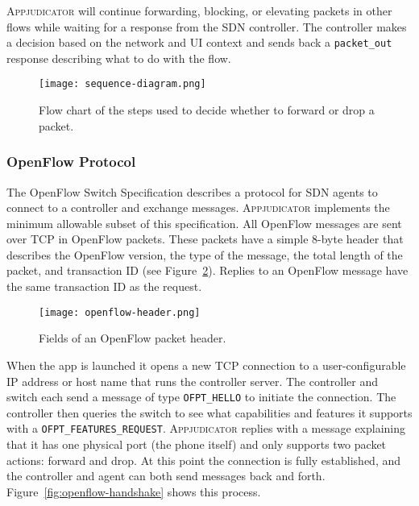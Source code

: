 \textsc{Appjudicator} will continue
forwarding, blocking, or elevating packets in other flows while waiting for a
response from the SDN controller. The controller makes a decision based on the
network and UI context and sends back a \texttt{packet\_out} response describing
what to do with the flow.

\begin{figure}[p]
    \centering
    \texttt{[image: sequence-diagram.png]}
    \caption{Flow chart of the steps used to decide whether to forward or drop a
		packet.}
    \label{fig:sequence-diagram}
\end{figure}

\subsubsection{OpenFlow Protocol}
\label{sec:openflow-protocol}

The OpenFlow Switch Specification describes a protocol for SDN agents to connect
to a controller and exchange messages. \textsc{Appjudicator} implements the
minimum allowable subset of this specification. All OpenFlow messages are sent
over TCP in OpenFlow packets. These packets have a simple 8-byte header that
describes the OpenFlow version, the type of the message, the total length of the
packet, and transaction ID (see Figure~\ref{fig:openflow-header}). Replies to an
OpenFlow message have the same transaction ID as the request.

\begin{figure}[h]
    \centering
    \texttt{[image: openflow-header.png]}
    \caption{Fields of an OpenFlow packet header.}
    \label{fig:openflow-header}
\end{figure}

When the app is launched it opens a new TCP connection to a user-configurable IP
address or host name that runs the controller server. The controller and switch
each send a message of type \texttt{OFPT\_HELLO} to initiate the connection. The
controller then queries the switch to see what capabilities and features it
supports with a \texttt{OFPT\_FEATURES\_REQUEST}.  \textsc{Appjudicator} replies
with a message explaining that it has one physical port (the phone itself) and
only supports two packet actions: forward and drop.  At this point the
connection is fully established, and the controller and agent can both send
messages back and forth. Figure~\ref{fig:openflow-handshake} shows this process.


